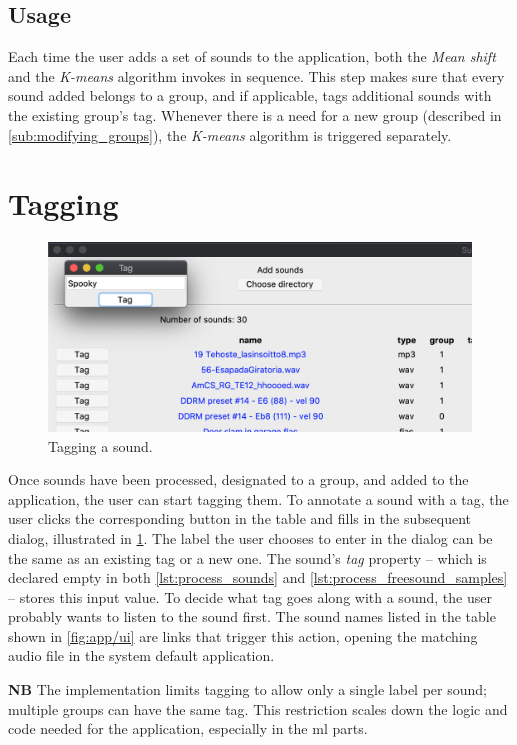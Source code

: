 \subsection{Usage}
Each time the user adds a set of sounds to the application, both the \emph{Mean shift} and the \emph{K-means} algorithm invokes in sequence. This step makes sure that every sound added belongs to a group, and if applicable, tags additional sounds with the existing group's tag. Whenever there is a need for a new group (described in \cref{sub:modifying_groups}), the \emph{K-means} algorithm is triggered separately.

\section{Tagging}\label{sec:tagging}
\begin{figure}[ht]
    \includegraphics[width=\textwidth]{figures/app/tagging}
    \caption{Tagging a sound.}\label{fig:app/tagging}
\end{figure}
Once sounds have been processed, designated to a group, and added to the application, the user can start tagging them. To annotate a sound with a tag, the user clicks the corresponding button in the table and fills in the subsequent dialog, illustrated in \cref{fig:app/tagging}. The label the user chooses to enter in the dialog can be the same as an existing tag or a new one. The sound's \emph{tag} property – which is declared empty in both \cref{lst:process_sounds} and \cref{lst:process_freesound_samples} – stores this input value. To decide what tag goes along with a sound, the user probably wants to listen to the sound first. The sound names listed in the table shown in \cref{fig:app/ui} are links that trigger this action, opening the matching audio file in the system default application.
\begin{mdframed}[style=info]
    \textbf{NB} The implementation limits tagging to allow only a single label per sound; multiple groups can have the same tag. This restriction scales down the logic and code needed for the application, especially in the \gls{ml} parts.
\end{mdframed}

